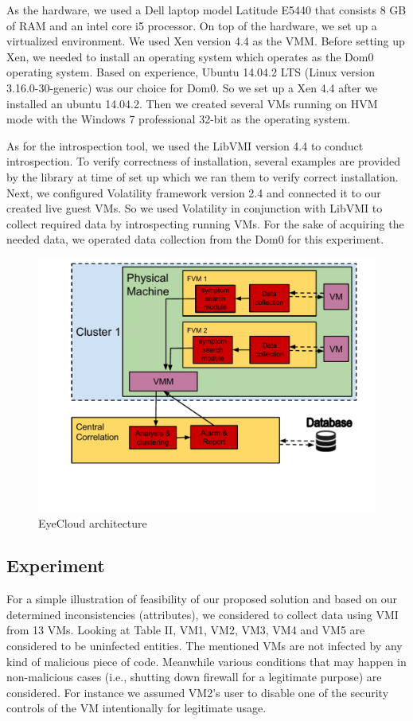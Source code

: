 \documentclass[conference]{IEEEtran}
\begin{document}
As the hardware, we used a Dell laptop model Latitude E5440 that consists 8 GB of RAM and an intel core i5 processor. On top of the hardware, we set up a virtualized environment. We used Xen version 4.4 as the VMM. Before setting up Xen, we needed to install an operating system which operates as the Dom0 operating system. Based on experience, Ubuntu 14.04.2 LTS (Linux version 3.16.0-30-generic) was our choice for Dom0. So we set up a Xen 4.4 after we installed an ubuntu 14.04.2. Then we created several VMs running on HVM mode with the Windows 7 professional 32-bit as the operating system. 

As for the introspection tool, we used the LibVMI version 4.4 to conduct introspection. To verify correctness of installation, several examples are provided by the library at time of set up which we ran them to verify correct installation. Next, we configured Volatility framework version 2.4 and connected it to our created live guest VMs. So we used Volatility in conjunction with LibVMI to collect required data by introspecting running VMs. For the sake of acquiring the needed data, we operated data collection from the Dom0 for this experiment.    
\begin{figure}
\begin{center}
\hspace{-1.5cm}
\includegraphics[scale=0.4]{pic114.pdf}
\caption{EyeCloud architecture}
\label{Fig:114}
\end{center}
\end{figure}
\subsection{Experiment}
For a simple illustration of feasibility of our proposed solution and based on our determined inconsistencies (attributes), we considered to collect data using VMI from 13 VMs. Looking at Table II, VM1, VM2, VM3, VM4 and VM5 are considered to be uninfected entities. The mentioned VMs are not infected by any kind of malicious piece of code. Meanwhile various conditions that may happen in non-malicious cases (i.e., shutting down firewall for a legitimate purpose) are considered. For instance we assumed VM2's user to disable one of the security controls of the VM intentionally for legitimate usage.   
\end{document}
